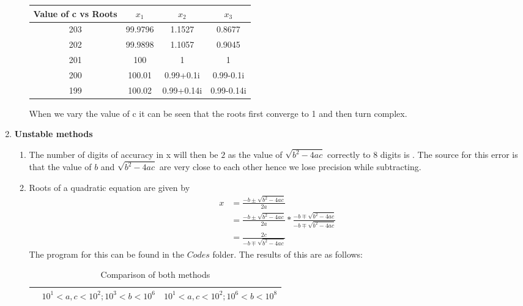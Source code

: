 \documentclass[11pt]{article}
\begin{document}
\begin{enumerate}
\begin{enumerate}
\begin{table}[!htb]
\begin{tabular}{|c|c|c|c|}
						\hline
						\textbf{Value of c vs Roots} & \textbf{$x_1$} & \textbf{$x_2$} & \textbf{$x_3$} \\ \hline
						203                          & 99.9796        & 1.1527         & 0.8677         \\ \hline
						202                          & 99.9898        & 1.1057         & 0.9045         \\ \hline
						201                          & 100            & 1              & 1              \\ \hline
						200                          & 100.01         & 0.99+0.1i      & 0.99-0.1i      \\ \hline
						199                          & 100.02         & 0.99+0.14i     & 0.99-0.14i     \\ \hline
						\end{tabular}
						\end{table}
						When we vary the value of c it can be seen that the roots first converge to 1 and then turn complex.
			\end{enumerate}
	\item \textbf{Unstable methods} \\
		\begin{enumerate}
			\item %
				The number of digits of accuracy in x will then be $2$ as the value of $\sqrt{b^2 - 4ac}$ correctly to 8 digits is .
				The source for this error is that the value of $b$ and $\sqrt{b^2 -4ac}$ are very close to each other hence we lose precision while subtracting.
			\item %
				Roots of a quadratic equation are given by 
					\begin{align*}
							x &= \frac{-b \pm \sqrt{b^2 -4ac}}{2a} \\
							  &= \frac{-b \pm \sqrt{b^2 -4ac}}{2a} * \frac{-b \mp \sqrt{b^2 -4ac}}{-b \mp \sqrt{b^2 -4ac}} \\
							&= \frac{2c}{-b \mp \sqrt{b^2 -4ac}}
					\end{align*}
				The program for this can be found in the $Codes$ folder.
				The results of this are as follows:
				\begin{table}[!htb]
				\centering
				\caption{Comparison of both methods}
				\label{my-label}
				\begin{tabular}{|c|c|c|}
				\hline
				\textbf{}                                     & $10^1<a,c<10^2 ;  10^3<b<10^6$ &   $10^1<a,c<10^2 ;  10^6<b<10^8$         \\ \hline

\end{tabular}
\end{table}
\end{enumerate}
\end{enumerate}
\end{document}
